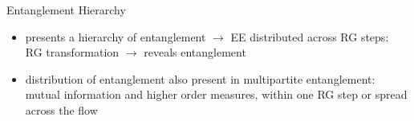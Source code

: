 \documentclass[12pt,aspectratio=169]{beamer}
\begin{document}
\begin{frame}{Entanglement Hierarchy}
\vspace*{\fill}

\begin{itemize}
	\item 
presents a \alert{hierarchy} of entanglement \(\longrightarrow\) EE distributed across RG steps:\\[10pt]
RG transformation \(\longrightarrow\) reveals entanglement

\vspace*{\fill}
\item distribution of entanglement also present in \alert{multipartite} entanglement:\\[10pt]
	mutual information and higher order measures, within one RG step or spread across the flow
\end{itemize}

\end{frame}
\end{document}
